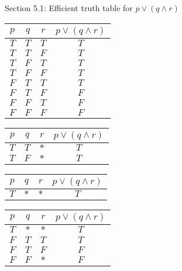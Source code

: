 \documentclass[style=simple,size=12pt]{powerdot}
\begin{document}
\begin{wideslide}[bm=,toc=]{Section 5.1: Efficient truth table for $p \vee (q\wedge r)$}
\begin{minipage}{0.42\textwidth}
\begin{tabular}{|c|c|c||c|}
\hline
$p$ & $q$ & $r$ & $p \vee (q\wedge r)$ \\ \hline \hline
$T$ & $T$ & $T$ & $T$ \\ \hline
$T$ & $T$ & $F$ & $T$ \\ \hline
$T$ & $F$ & $T$ & $T$ \\ \hline
$T$ & $F$ & $F$ & $T$ \\ \hline
$F$ & $T$ & $T$ & $T$ \\ \hline
$F$ & $T$ & $F$ & $F$ \\ \hline
$F$ & $F$ & $T$ & $F$ \\ \hline
$F$ & $F$ & $F$ & $F$ \\ \hline
\end{tabular}
\end{minipage}
\hspace{0.08\textwidth}
\begin{minipage}{0.42\textwidth}
\begin{tabular}{|c|c|c||c|}
\hline
$p$ & $q$ & $r$ & $p \vee (q\wedge r)$ \\ \hline \hline
$T$ & $T$ & $*$ & $T$ \\ \hline
$T$ & $F$ & $*$ & $T$ \\ \hline
\end{tabular}

\bigskip

\begin{tabular}{|c|c|c||c|}
\hline
$p$ & $q$ & $r$ & $p \vee (q\wedge r)$ \\ \hline \hline
$T$ & $*$ & $*$ & $T$ \\ \hline
\end{tabular}

\bigskip

\begin{tabular}{|c|c|c||c|}
\hline
$p$ & $q$ & $r$ & $p \vee (q\wedge r)$ \\ \hline \hline
$T$ & $*$ & $*$ & $T$ \\ \hline
$F$ & $T$ & $T$ & $T$ \\ \hline
$F$ & $T$ & $F$ & $F$ \\ \hline
$F$ & $F$ & $*$ & $F$ \\ \hline
\end{tabular}
\end{minipage}
\end{wideslide}
\end{document}
